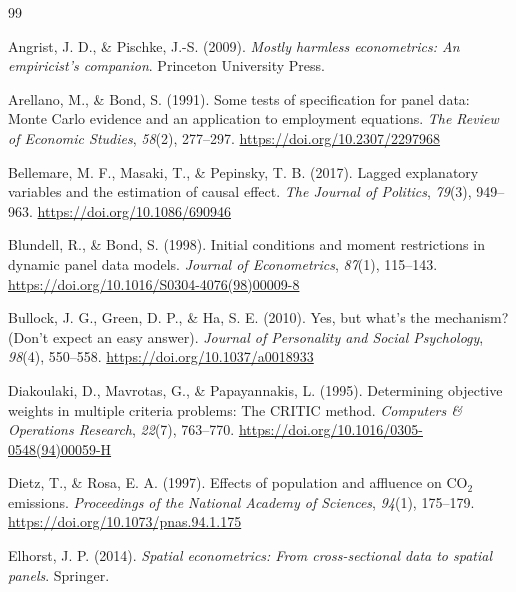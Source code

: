 \documentclass[economies,article,submit,moreauthors]{Definitions/mdpi}
\begin{document}
\clearpage
{}
\begin{thebibliography}{99}

Angrist, J. D., \& Pischke, J.-S. (2009). \textit{Mostly harmless econometrics: An empiricist's companion}. Princeton University Press.

Arellano, M., \& Bond, S. (1991). Some tests of specification for panel data: Monte Carlo evidence and an application to employment equations. \textit{The Review of Economic Studies}, \textit{58}(2), 277--297. \url{https://doi.org/10.2307/2297968}

Bellemare, M. F., Masaki, T., \& Pepinsky, T. B. (2017). Lagged explanatory variables and the estimation of causal effect. \textit{The Journal of Politics}, \textit{79}(3), 949--963. \url{https://doi.org/10.1086/690946}

Blundell, R., \& Bond, S. (1998). Initial conditions and moment restrictions in dynamic panel data models. \textit{Journal of Econometrics}, \textit{87}(1), 115--143. \url{https://doi.org/10.1016/S0304-4076(98)00009-8}

Bullock, J. G., Green, D. P., \& Ha, S. E. (2010). Yes, but what's the mechanism? (Don't expect an easy answer). \textit{Journal of Personality and Social Psychology}, \textit{98}(4), 550--558. \url{https://doi.org/10.1037/a0018933}

Diakoulaki, D., Mavrotas, G., \& Papayannakis, L. (1995). Determining objective weights in multiple criteria problems: The CRITIC method. \textit{Computers \& Operations Research}, \textit{22}(7), 763--770. \url{https://doi.org/10.1016/0305-0548(94)00059-H}

Dietz, T., \& Rosa, E. A. (1997). Effects of population and affluence on CO$_2$ emissions. \textit{Proceedings of the National Academy of Sciences}, \textit{94}(1), 175--179. \url{https://doi.org/10.1073/pnas.94.1.175}

Elhorst, J. P. (2014). \textit{Spatial econometrics: From cross-sectional data to spatial panels}. Springer.


\end{thebibliography}
\end{document}
